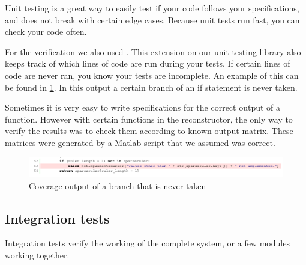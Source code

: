 \documentclass[a4paper, openany, oneside]{memoir}
\begin{document}
Unit testing is a great way to easily test if your code follows your specifications, and does not break with certain edge cases. Because unit tests run fast, you can check your code often.

For the verification we also used . This extension on our unit testing library also keeps track of which lines of code are run during your tests. If certain lines of code are never ran, you know your tests are incomplete. An example of this can be found in \cref{fig:coverage_branch}. In this output a certain branch of an if statement is never taken.

Sometimes it is very easy to write specifications for the correct output of a function. However with certain functions in the reconstructor, the only way to verify the results was to check them according to known output matrix. These matrices were generated by a Matlab script that we assumed was correct.

\begin{figure}[h]
    \centering
    \includegraphics[width=\textwidth]{fig_branch_coverage.pdf}
    \caption{Coverage output of a branch that is never taken}
    \label{fig:coverage_branch}
\end{figure}

\subsection{Integration tests}
Integration tests verify the working of the complete system, or a few modules working together.
\end{document}
